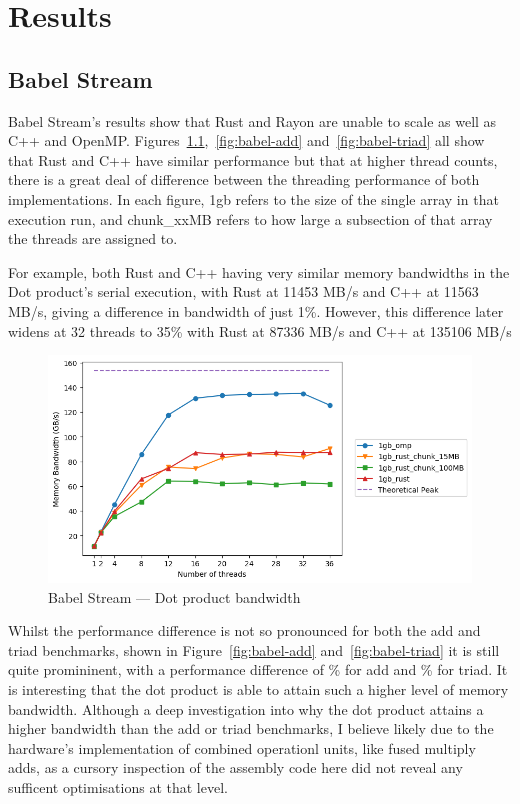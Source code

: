 \chapter{Results}
\section{Babel Stream}\label{sec:res-babel}
Babel Stream's results show that Rust and Rayon are unable to scale as well as C++ and OpenMP\@. Figures~\ref{fig:babel-dot},~\ref{fig:babel-add} and~\ref{fig:babel-triad} all show that Rust and C++ have similar performance but that at higher thread counts, there is a great deal of difference between the threading performance of both implementations. In each figure, 1gb refers to the size of the single array in that execution run, and chunk\_xxMB refers to how large a subsection of that array the threads are assigned to.

For example, both Rust and C++ having very similar memory bandwidths in the Dot product's serial execution, with Rust at 11453 MB/s and C++ at 11563 MB/s, giving a difference in bandwidth of just 1\%.
However, this difference later widens at 32 threads to 35\% with Rust at 87336 MB/s and C++ at 135106 MB/s

\begin{figure}[h]
\centering
\includegraphics[width=.9\linewidth]{figs/babel/Dot.png}
\caption{Babel Stream --- Dot product bandwidth}\label{fig:babel-dot}
\end{figure}

Whilst the performance difference is not so pronounced for both the add and triad benchmarks, shown in Figure~\ref{fig:babel-add} and~\ref{fig:babel-triad} it is still quite promininent, with a performance difference of \% for add and \% for triad. It is interesting that the dot product is able to attain such a higher level of memory bandwidth. Although a deep investigation into why the dot product attains a higher bandwidth than the add or triad benchmarks, I believe likely due to the hardware's implementation of combined operationl units, like fused multiply adds, as a cursory inspection of the assembly code here did not reveal any sufficent optimisations at that level.

